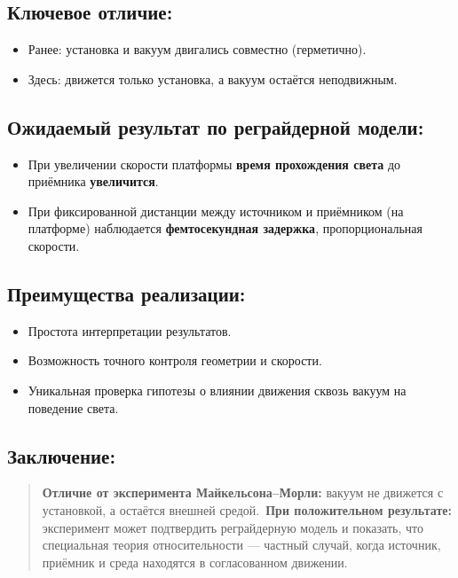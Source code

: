 \documentclass[12pt]{article}
\begin{document}
\subsection*{Ключевое отличие:}
\begin{itemize}
    \item Ранее: установка и вакуум двигались совместно (герметично).
    \item Здесь: движется только установка, а вакуум остаётся неподвижным.
\end{itemize}

\subsection*{Ожидаемый результат по реграйдерной модели:}
\begin{itemize}
    \item При увеличении скорости платформы \textbf{время прохождения света} до приёмника \textbf{увеличится}.
    \item При фиксированной дистанции между источником и приёмником (на платформе) наблюдается \textbf{фемтосекундная задержка}, пропорциональная скорости.
\end{itemize}

\subsection*{Преимущества реализации:}
\begin{itemize}
    \item Простота интерпретации результатов.
    \item Возможность точного контроля геометрии и скорости.
    \item Уникальная проверка гипотезы о влиянии движения сквозь вакуум на поведение света.
\end{itemize}

\subsection*{Заключение:}
\begin{quote}
\textbf{Отличие от эксперимента Майкельсона–Морли:} вакуум не движется с установкой, а остаётся внешней средой.\
\textbf{При положительном результате:} эксперимент может подтвердить реграйдерную модель и показать, что специальная теория относительности — частный случай, когда источник, приёмник и среда находятся в согласованном движении.
\end{quote}
\end{document}
